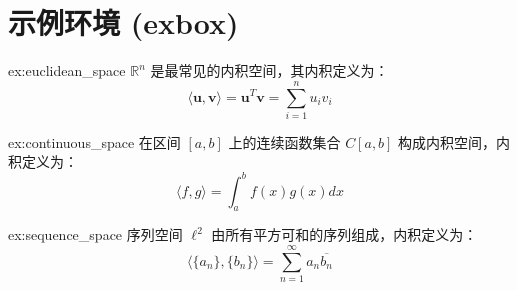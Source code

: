 \section{示例环境 (exbox)}

\begin{exbox}[欧几里得空间]{ex:euclidean_space}
\( \mathbb{R}^n \) 是最常见的内积空间，其内积定义为：
\[
\langle \mathbf{u}, \mathbf{v} \rangle = \mathbf{u}^T \mathbf{v} = \sum_{i=1}^{n} u_i v_i
\]
\end{exbox}

\begin{exbox}[连续函数空间]{ex:continuous_space}
在区间 \([a, b]\) 上的连续函数集合 \( C[a, b] \) 构成内积空间，内积定义为：
\[
\langle f, g \rangle = \int_a^b f(x)g(x) dx
\]
\end{exbox}

\begin{exbox}[序列空间]{ex:sequence_space}
序列空间 \( \ell^2 \) 由所有平方可和的序列组成，内积定义为：
\[
\langle \{a_n\}, \{b_n\} \rangle = \sum_{n=1}^{\infty} a_n \overline{b_n}
\]
\end{exbox}